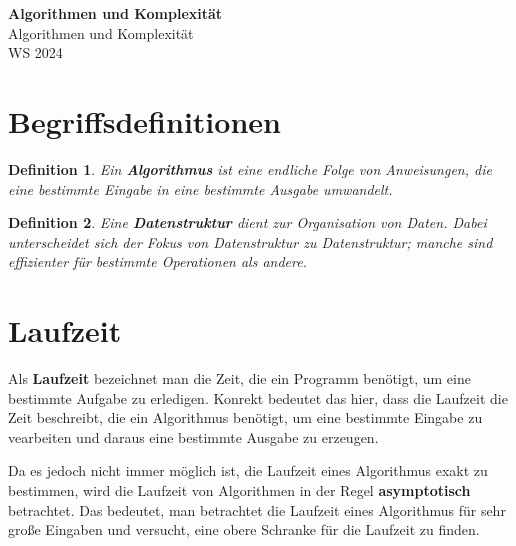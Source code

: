 \documentclass[11pt]{article}
\begin{document}
\thispagestyle{empty}

\newtheorem{anmk}{Anmerkung}[section]
\newtheorem{bsp}{Beispiel}[section]
\newtheorem{definition}{Definition}[section]

\renewcommand{\figurename}{Fig.}

\newcommand{\ol}[1]{\begin{enumerate}#1\end{enumerate}}
\newcommand{\ul}[1]{\begin{itemize}#1\end{itemize}}
\newcommand{\li}[1]{\item{#1}}
\newcommand{\equivto}{\Longleftrightarrow}
\newcommand{\sube}{\subseteq}

\newcommand{\N}{\mathbb{N}}
\newcommand{\Z}{\mathbb{Z}}
\newcommand{\R}{\mathbb{R}}

\begin{center}
  {\LARGE \bf Algorithmen und Komplexität}\\
  {\Large Algorithmen und Komplexität}\\
  WS 2024
\end{center}

\section{Begriffsdefinitionen}
\begin{definition}
  Ein \textbf{Algorithmus} ist eine endliche Folge von Anweisungen, die eine bestimmte Eingabe in eine bestimmte Ausgabe
  umwandelt.
\end{definition}
\begin{definition}
  Eine \textbf{Datenstruktur} dient zur Organisation von Daten. Dabei unterscheidet sich der Fokus von Datenstruktur zu 
  Datenstruktur; manche sind effizienter für bestimmte Operationen als andere.
\end{definition}

\section{Laufzeit}
Als \textbf{Laufzeit} bezeichnet man die Zeit, die ein Programm benötigt, um eine bestimmte Aufgabe zu erledigen. Konrekt bedeutet
das hier, dass die Laufzeit die Zeit beschreibt, die ein Algorithmus benötigt, um eine bestimmte Eingabe zu vearbeiten und
daraus eine bestimmte Ausgabe zu erzeugen.

Da es jedoch nicht immer möglich ist, die Laufzeit eines Algorithmus exakt zu bestimmen, wird die Laufzeit von Algorithmen
in der Regel \textbf{asymptotisch} betrachtet. Das bedeutet, man betrachtet die Laufzeit eines Algorithmus für sehr große
Eingaben und versucht, eine obere Schranke für die Laufzeit zu finden.
\end{document}
